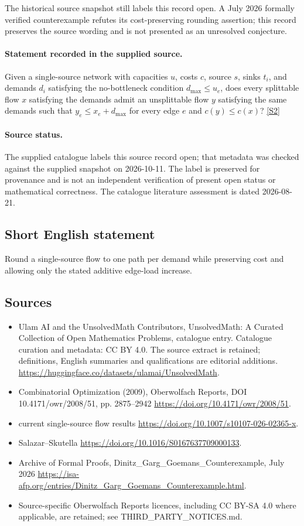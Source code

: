 \documentclass[11pt]{article}
\begin{document}
The historical source snapshot still labels this record open. A July 2026 formally verified counterexample refutes its cost-preserving rounding assertion; this record preserves the source wording and is not presented as an unresolved conjecture.
\paragraph{Statement recorded in the supplied source.}
Given a single-source network with capacities $u$, costs $c$, source $s$, sinks $t_i$, and demands $d_i$ satisfying the no-bottleneck condition $d_{\max}\leq u_e$, does every splittable flow $x$ satisfying the demands admit an unsplittable flow $y$ satisfying the same demands such that $y_e\leq x_e+d_{\max}$ for every edge $e$ and $c(y)\leq c(x)$? \href{https://doi.org/10.4171/owr/2008/51}{[S2]}
\paragraph{Source status.}
The supplied catalogue labels this source record open; that metadata was checked against the supplied snapshot on 2026-10-11. The label is preserved for provenance and is not an independent verification of present open status or mathematical correctness. The catalogue literature assessment is dated 2026-08-21.
\subsection{Short English statement}
Round a single-source flow to one path per demand while preserving cost and allowing only the stated additive edge-load increase.
\subsection{Sources}
\begin{itemize}
\item[S1] Ulam AI and the UnsolvedMath Contributors, UnsolvedMath: A Curated Collection of Open Mathematics Problems, catalogue entry. Catalogue curation and metadata: CC BY 4.0. The source extract is retained; definitions, English summaries and qualifications are editorial additions.
\url{https://huggingface.co/datasets/ulamai/UnsolvedMath}.
\item[S2] Combinatorial Optimization (2009), Oberwolfach Reports, DOI 10.4171/owr/2008/51, pp. 2875--2942
\url{https://doi.org/10.4171/owr/2008/51}.
\item[S3] current single-source flow results
\url{https://doi.org/10.1007/s10107-026-02365-x}.
\item[S4] Salazar--Skutella
\url{https://doi.org/10.1016/S0167637709000133}.
\item[S5] Archive of Formal Proofs, Dinitz\_Garg\_Goemans\_Counterexample, July 2026
\url{https://isa-afp.org/entries/Dinitz_Garg_Goemans_Counterexample.html}.
\item Source-specific Oberwolfach Reports licences, including CC BY-SA 4.0 where applicable, are retained; see THIRD\_PARTY\_NOTICES.md.
\end{itemize}
\end{document}
